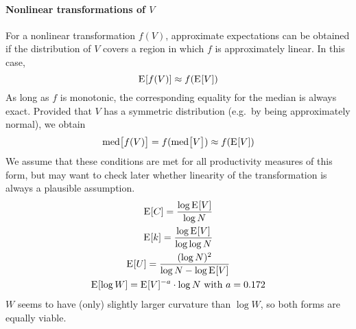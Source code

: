 \documentclass[a4paper]{article}
\begin{document}
\paragraph{Nonlinear transformations of $V$}
For a nonlinear transformation $f(V)$, approximate expectations can be obtained
if the distribution of $V$ covers a region in which $f$ is approximately linear.
In this case,
\begin{equation}
  \label{eq:prod:exp-nonlinear}
  \mathrm{E}_{}[f(V)] \approx f(\mathrm{E}_{}[V])
\end{equation}
As long as $f$ is monotonic, the corresponding equality for the median is
always exact. Provided that $V$ has a symmetric distribution (e.g.\ by being
approximately normal), we obtain
\begin{equation}
  \label{eq:prod:median-nonlinear}
  \text{med}\bigl[ f(V) \bigr] = f( \text{med}\bigl[ V \bigr] )
  \approx f( \mathrm{E}_{}[V] )
\end{equation}
We assume that these conditions are met for all productivity measures of this
form, but may want to check later whether linearity of the transformation is
always a plausible assumption.
\begin{gather}
  \mathrm{E}_{}[C] = \frac{\log \mathrm{E}_{}[V]}{\log N}\\
  \mathrm{E}_{}[k] = \frac{\log \mathrm{E}_{}[V]}{\log \log N}\\
  \mathrm{E}_{}[U] = \frac{(\log N)^2}{\log N - \log \mathrm{E}_{}[V]}\\
  \mathrm{E}_{}[\log W] = \mathrm{E}_{}[V]^{-a}\cdot \log N \text{ with } a = 0.172
\end{gather}
$W$ seems to have (only) slightly larger curvature than $\log W$, so both
forms are equally viable.
\end{document}
